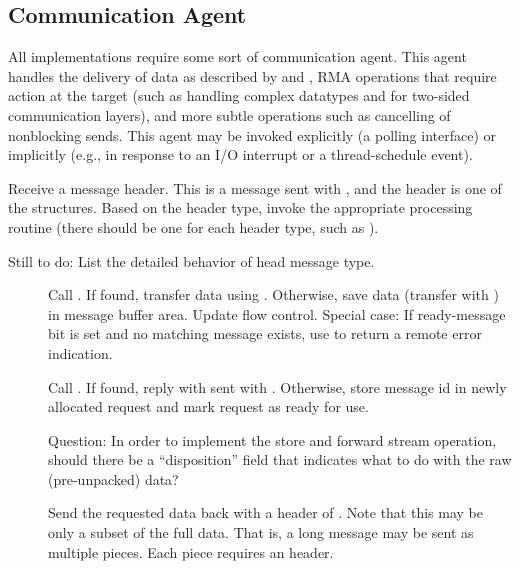 \documentclass{article}
\begin{document}
\subsection{Communication Agent}
\label{sec:comm-agent}
All implementations require some sort of communication agent.  This agent
handles the delivery of data as described by  and
, RMA operations that require action at the target (such as
handling complex datatypes and for two-sided communication layers), and more
subtle operations such as cancelling of nonblocking sends.  This agent may be
invoked explicitly (a polling interface) or implicitly (e.g., in response to
an I/O interrupt or a thread-schedule event).  

\begin{tcp}
Receive a message header.  This is a message sent with ,
and the header is one of the  structures.
Based on the header type, invoke the appropriate processing routine (there
should be one for each header type, such as
). 

Still to do:  List the detailed behavior of head message type.
\begin{description}
\item[]
Call .  If found, transfer data using
.  Otherwise, save data (transfer with ) in
message buffer area.  Update flow control.
Special case: If ready-message bit is set and no matching message
exists, use  to return a remote error indication.

\item[]
Call .  If found, reply with
 sent with .  Otherwise,
store message id in newly allocated request and mark request as ready for use.

Question: In order to implement the store and forward stream
operation, should there be a ``disposition'' field that indicates what
to do with the raw (pre-unpacked) data?

\item[]Send the requested data back
with a header of .  Note that this may be
only a subset of the full data.  That is, a long message may be sent
as multiple pieces.  Each piece requires an 
header.


\end{description}
\end{tcp}
\end{document}
